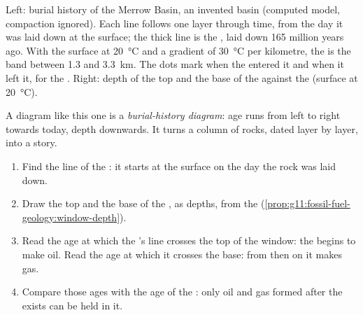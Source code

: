 \begin{omfigure}
{\small Left: burial history of the Merrow Basin, an invented basin (computed
model, compaction ignored). Each line follows one layer through time, from
the day it was laid down at the surface; the thick line is the ,
laid down 165 million years ago. With the surface at
\qty{20}{\degreeCelsius} and a gradient of \qty{30}{\degreeCelsius} per
kilometre, the  is the band between \num{1.3} and
\qty{3.3}{km}. The dots mark when the  entered it and when it
left it, for the . Right: depth of the top and the base of the  against the  (surface at
\qty{20}{\degreeCelsius}).}
\end{omfigure}

A diagram like this one is a \emph{burial-history diagram}: age runs from
left to right towards today, depth downwards. It turns a column of rocks,
dated layer by layer, into a story.

\begin{method}\label{met:g11:fossil-fuel-geology:burial}
\begin{enumerate}
  \item Find the line of the : it starts at the surface on the
        day the rock was laid down.
  \item Draw the top and the base of the , as depths, from the
         (\cref{prop:g11:fossil-fuel-geology:window-depth}).
  \item Read the age at which the 's line crosses the top of the
        window: the  begins to make oil. Read the age at which it
        crosses the base: from then on it makes gas.
  \item Compare those ages with the age of the : only oil and gas
        formed after the  exists can be held in it.
\end{enumerate}
\end{method}

